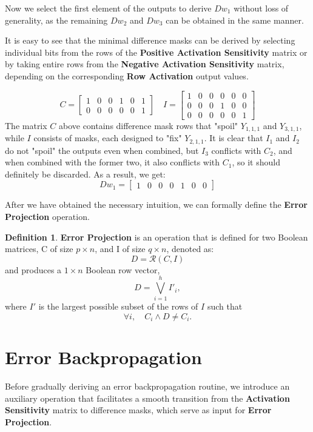 \documentclass{article}
\theoremstyle{definition}
\newtheorem*{definition}{Definition}
\theoremstyle{remark}
\begin{document}
Now we select the first element of the outputs to derive \( Dw_1 \) without loss of generality, as the remaining \( Dw_2 \) and \( Dw_3 \) can be obtained in the same manner.

It is easy to see that the minimal difference masks can be derived by selecting individual bits from the rows of the \textbf{Positive Activation Sensitivity} matrix or by taking entire rows from the \textbf{Negative Activation Sensitivity} matrix, depending on the corresponding \textbf{Row Activation} output values.

\[
    C = \begin{bmatrix}
        1 & 0 & 0 & 1 & 0 & 1 \\
        0 & 0 & 0 & 0 & 0 & 1
    \end{bmatrix}
    \quad
    I = \begin{bmatrix}
        1 & 0 & 0 & 0 & 0 & 0 \\
        0 & 0 & 0 & 1 & 0 & 0 \\
        0 & 0 & 0 & 0 & 0 & 1
    \end{bmatrix}
\]
The matrix \( C \) above contains difference mask rows that "spoil" \( Y_{1,1,1} \) and \( Y_{3,1,1} \), while \( I \) consists of masks, each designed to "fix" \( Y_{2,1,1} \). It is clear that \( I_1 \) and \( I_2 \) do not "spoil" the outputs even when combined, but \( I_3 \) conflicts with \( C_2 \), and when combined with the former two, it also conflicts with \( C_1 \), so it should definitely be discarded. As a result, we get:
\[
    Dw_1 = \begin{bmatrix} 1 & 0 & 0 & 0 & 1 & 0 & 0 \end{bmatrix}
\]

After we have obtained the necessary intuition, we can formally define the \textbf{Error Projection} operation.

\begin{definition}
    \textbf{Error Projection} is an operation that is defined for two Boolean matrices, C of size \( p \times n \), and I of size \( q \times n \), denoted as:
    \[
        D = \mathcal{R}(C, I)
    \]
    and produces a \( 1 \times n \) Boolean row vector,
    \[
        D = \bigvee_{i=1}^{h} I'_{i},
    \]
    where \( I' \) is the largest possible subset of the rows of \( I \) such that
    \[
        \forall i, \quad C_i \wedge D \neq C_i.
    \]
\end{definition}

\section{Error Backpropagation}
Before gradually deriving an error backpropagation routine, we introduce an auxiliary operation that facilitates a smooth transition from the \textbf{Activation Sensitivity} matrix to difference masks, which serve as input for \textbf{Error Projection}.
\end{document}
